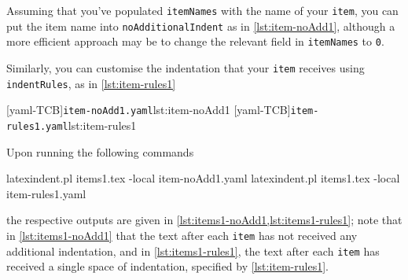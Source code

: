 \documentclass[10pt]{article}
\begin{document}
 Assuming that you've populated \texttt{itemNames} with the name of your \texttt{item},
 you can put the item name into \texttt{noAdditionalIndent} as in \cref{lst:item-noAdd1},
 although a more efficient approach may be to change the relevant field in
 \texttt{itemNames} to \texttt{0}.

 \begin{example}
 Similarly, you can customise the indentation that your \texttt{item} receives using
 \texttt{indentRules}, as in \cref{lst:item-rules1}

 \begin{cmhtcbraster}[raster column skip=.1\linewidth]
  [yaml-TCB]{\texttt{item-noAdd1.yaml}}{lst:item-noAdd1}
  [yaml-TCB]{\texttt{item-rules1.yaml}}{lst:item-rules1}
 \end{cmhtcbraster}

 Upon running the following commands 

 \begin{commandshell}
latexindent.pl items1.tex -local item-noAdd1.yaml  
latexindent.pl items1.tex -local item-rules1.yaml  
\end{commandshell}

 the respective outputs are given in \cref{lst:items1-noAdd1,lst:items1-rules1}; note
 that in \cref{lst:items1-noAdd1} that the text after each \texttt{item} has not received
 any additional indentation, and in \cref{lst:items1-rules1}, the text after each
 \texttt{item} has received a single space of indentation, specified by
 \cref{lst:item-rules1}.

 \begin{cmhtcbraster}
 \end{cmhtcbraster}
 \end{example}
\end{document}
